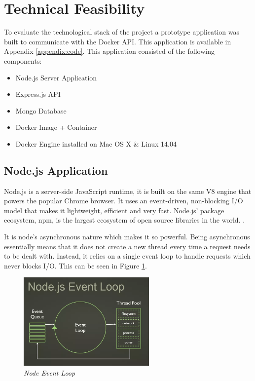 \section{Technical Feasibility}
\label{sec:feasibility}
To evaluate the technological stack of the project a prototype application was built to communicate with the Docker API. This application is available in Appendix \ref{appendix:code}. This application consisted of the following components:

\begin{itemize}
  \item Node.js Server Application
  \item Express.js API
	\item Mongo Database
  \item Docker Image + Container
  \item Docker Engine installed on Mac OS X \& Linux 14.04 
\end{itemize}

\subsection{Node.js Application}
\label{sub:nodejs}
Node.js is a server-side JavaScript runtime, it is built on the same V8 engine that powers the popular Chrome browser. It uses an event-driven, non-blocking I/O model that makes it lightweight, efficient and very fast. Node.js' package ecosystem, npm, is the largest ecosystem of open source libraries in the world. \citep{Nodejs.org2016}.

It is node's asynchronous nature which makes it so powerful. Being asynchronous essentially means that it does not create a new thread every time a request needs to be dealt with. Instead, it relies on a single event loop to handle requests which never blocks I/O. This can be seen in Figure \ref{fig:event_loop}.

\begin{figure}[!h]
\centering
\includegraphics*[width=0.6\textwidth]{images/event_loop}
\caption{\em Node Event Loop}
\label{fig:event_loop}
\end{figure}

